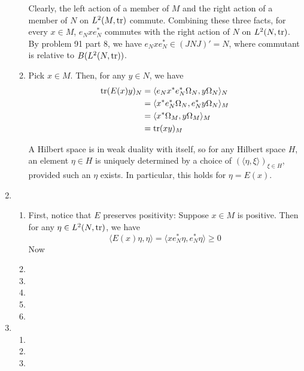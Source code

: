 \documentclass[a4paper,10pt]{report}
\newcommand{\ggen}[1]{\langle#1\rangle}
\begin{document}
\begin{enumerate}
\begin{enumerate}
				Clearly, the left action of a member of $M$ and the right action of a member of $N$ on $L^2(M,\operatorname{tr})$ commute. Combining these three facts, for every $x\in M$, $e_Nxe_N^*$ commutes with the right action of $N$ on $L^2(N,\operatorname{tr})$. By problem 91 part 8, we have $e_Nxe_N^*\in(JNJ)'=N$, where commutant is relative to $B(L^2(N,\operatorname{tr}))$. 
			\item Pick $x\in M$. 
				Then, for any $y\in N$, we have 
				\begin{align*}
					\tr(E(x)y)_N &= \ggen{e_Nx^*e_N^*\Omega_N,y\Omega_N}_N\\
					&= \ggen{x^*e_N^*\Omega_N,e_N^*y\Omega_N}_M\\
					&= \ggen{x^*\Omega_M,y\Omega_M}_M\\
					&= \tr(xy)_M
				\end{align*}
				
				A Hilbert space is in weak duality with itself, so for any Hilbert space $H$, an element $\eta\in H$ is uniquely determined by a choice of $(\ggen{\eta,\xi})_{\xi\in H}$, provided such an $\eta$ exists. In particular, this holds for $\eta=E(x)$. 
		\end{enumerate}
	\item 
		\begin{enumerate}
			\item First, notice that $E$ preserves positivity: Suppose $x\in M$ is positive. Then for any $\eta\in L^2(N,\operatorname{tr})$, we have 
				\[\ggen{E(x)\eta,\eta}=\ggen{xe_N^*\eta,e_N^*\eta}\ge0\]
				Now 
			\item 
			\item 
			\item 
			\item 
			\item 
		\end{enumerate}
	\item
		\begin{enumerate}
			\item 
			\item 
			\item 
		\end{enumerate}
\end{enumerate}
\end{document}
